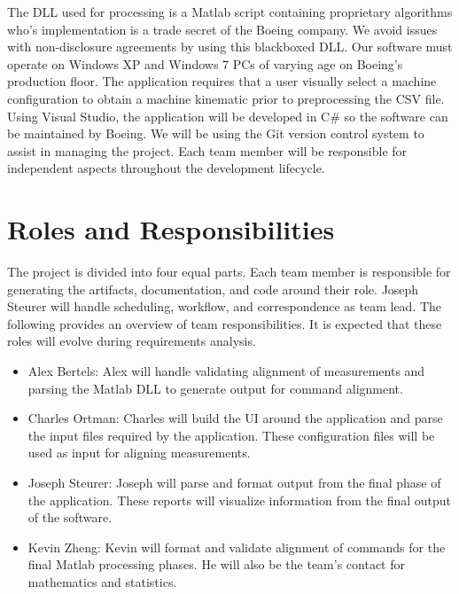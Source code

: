\documentclass[pdftex,10pt,a4paper]{article}
\begin{document}
The DLL used for processing is a Matlab script containing proprietary algorithms who's implementation is a trade secret of the Boeing company. We avoid issues with non-disclosure agreements by using this blackboxed DLL. Our software must operate on Windows XP and Windows 7 PCs of varying age on Boeing's production floor. The application requires that a user visually select a machine configuration to obtain a machine kinematic prior to preprocessing the CSV file. Using Visual Studio, the application will be developed in C\# so the software can be maintained by Boeing. We will be using the Git version control system to assist in managing the project. Each team member will be responsible for independent aspects throughout the development lifecycle.
\pagebreak
\section*{Roles and Responsibilities}
The project is divided into four equal parts. Each team member is responsible for generating the artifacts, documentation, and code around their role. Joseph Steurer will handle scheduling, workflow, and correspondence as team lead. The following provides an overview of team responsibilities. It is expected that these roles will evolve during requirements analysis. 
\begin{itemize}
  \item Alex Bertels: Alex will handle validating alignment of measurements and parsing the Matlab DLL to generate output for command alignment. 
  \item Charles Ortman: Charles will build the UI around the application and parse the input files required by the application. These configuration files will be used as input for aligning measurements.
  \item Joseph Steurer: Joseph will parse and format output from the final phase of the application. These reports will visualize information from the final output of the software.
  \item Kevin Zheng: Kevin will format and validate alignment of commands for the final Matlab processing phases. He will also be the team's contact for mathematics and statistics.   
\end{itemize}
\end{document}
